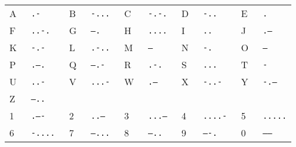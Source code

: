 \documentclass{article}
\begin{document}
     
\begin{tabular}{|l|>{\tt}l||l|>{\tt}l||l|>{\tt}l||l|>{\tt}l||l|>{\tt}l|}\hline
          A &     .- & B &  -... & C &  -.-. & D &   -.. & E &  .\\
          F &   ..-. & G &   --. & H &  .... & I &    .. & J &   .---\\
          K &    -.- & L &  .-.. & M &    -- & N &    -. & O &   --- \\
          P &  .--.  & Q &   --.- & R &  .-. & S &   ... & T &    - \\
          U &  ..-   & V &   ...- & W &  .-- & X &  -..- & Y &  -.-- \\
          Z &  --..  &   &        &   &      &   &       &   &        
\\\hline
          1 &  .---- & 2 & ..--- & 3 & ...-- & 4 & ....- & 5 &  .....\\
          6 &  -.... & 7 & --... & 8 & ---.. & 9 & ----. & 0 & -----
\\\hline
        \end{tabular}
\end{document}
